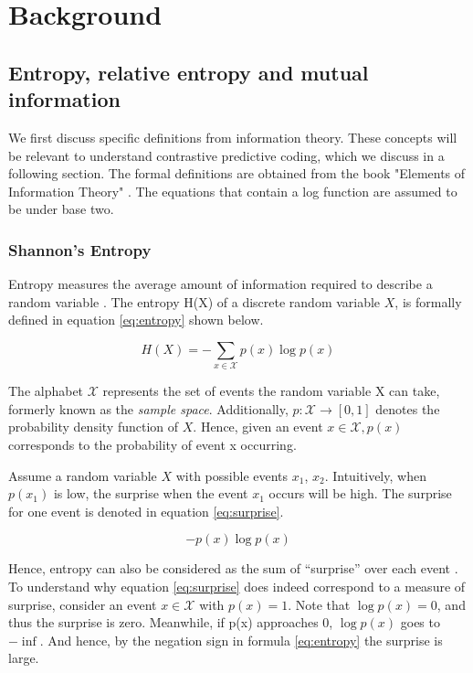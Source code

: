 
\chapter{Background}
\section{Entropy, relative entropy and mutual information}
We first discuss specific definitions from information theory. These concepts will be relevant to understand contrastive predictive coding, which we discuss in a following section. The formal definitions are obtained from the book "Elements of Information Theory" \cite{coverELEMENTSINFORMATIONTHEORY}. The equations that contain a log function are assumed to be under base two.
\subsection{Shannon's Entropy}
Entropy measures the average amount of information required to describe a random variable \cite{coverELEMENTSINFORMATIONTHEORY}. The entropy H(X) of a discrete random variable $X$, is formally defined in equation \ref{eq:entropy} shown below. 

\begin{equation}
	H(X) = -\sum_{x\in\mathcal{X}} p(x) \log p(x)  \label{eq:entropy}
\end{equation}

The alphabet $\mathcal{X}$ represents the set of events the random variable X can take, formerly known as the \textit{sample space}. Additionally, $p: \mathcal{X} \rightarrow [0, 1]$ denotes the probability density function of $X$. Hence, given an event $ x \in \mathcal{X}, p(x) $ corresponds to the probability of event x occurring.

Assume a random variable $X$ with possible events $x_1$, $x_2$. Intuitively, when $p(x_1)$ is low, the surprise when the event $x_1$ occurs will be high. The surprise for one event is denoted in equation \ref{eq:surprise}. 

\begin{equation}
	-p(x) \log p(x) \label{eq:surprise}
\end{equation}

Hence, entropy can also be considered as the sum of “surprise” over each event \cite{datasciencecoursesAliGhodsiLec2017}. 
To understand why equation \ref{eq:surprise} does indeed correspond to a measure of surprise, consider an event $x \in \mathcal{X}$ with $p(x) = 1$. Note that $\log p(x) = 0$, and thus the surprise is zero. Meanwhile, if p(x) approaches $0$, $\log p(x)$ goes to $- \inf$. And hence, by the negation sign in formula \ref{eq:entropy} the surprise is large.


